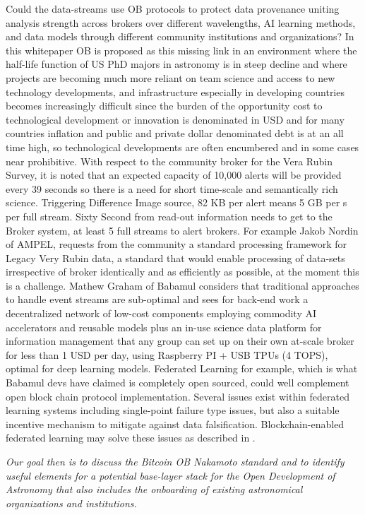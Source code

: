 \documentclass[final,5p,times,twocolumn,authoryear]{elsarticle}
\begin{document}
 Could the data-streams use OB protocols to protect data provenance uniting analysis strength across brokers over different wavelengths, AI learning methods, and data models through different community institutions and organizations? In this whitepaper OB is proposed as this missing link in an environment where the half-life function of US PhD majors in astronomy is in steep decline and where projects are becoming much more reliant on team science and access to new technology developments, and infrastructure especially in developing countries becomes increasingly difficult since the burden of the opportunity cost to technological development or innovation is denominated in USD and for many countries inflation and public and private dollar denominated debt is at an all time high, so technological developments are often encumbered and in some cases near prohibitive. With respect to the community broker for the Vera Rubin Survey, it is noted that an expected capacity of 10,000 alerts will be provided every 39 seconds so there is a need for short time-scale and semantically rich science. Triggering Difference Image source, 82 KB per alert means 5 GB per s per full stream. Sixty Second from read-out information needs to get to the Broker system, at least 5 full streams to alert brokers.   For example  Jakob Nordin of AMPEL, requests from the community a standard processing framework for Legacy Very Rubin data, a standard that would enable processing of data-sets irrespective of broker identically and as efficiently as possible, at the moment this is a challenge.  Mathew Graham of Babamul considers that traditional approaches to handle event streams are sub-optimal and sees for back-end work a decentralized network of low-cost components employing commodity AI accelerators and reusable models plus an in-use science data platform for information management that any group can set up on their own at-scale broker for less than 1 USD per day, using Raspberry PI + USB TPUs (4 TOPS), optimal for deep learning models.  Federated Learning for example, which is what Babamul devs have claimed is completely open sourced, could well complement open block chain protocol implementation. Several issues exist within federated learning systems including single-point failure type issues, but also a suitable incentive mechanism to mitigate against data falsification. Blockchain-enabled federated learning may solve these issues as described in \cite{zhu2023}. 

\emph{Our goal then is to discuss the Bitcoin OB Nakamoto standard and to identify useful elements for a potential base-layer stack for the Open Development of Astronomy that also includes the onboarding of existing astronomical organizations and institutions.}
\end{document}
